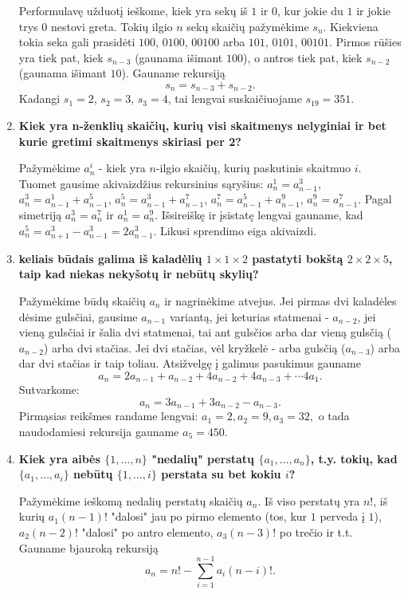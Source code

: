 \begin{enumerate}
Performulavę užduotį ieškome, kiek yra sekų iš $1$ ir $0$, kur jokie du $1$ ir jokie trys $0$ nestovi greta. Tokių ilgio $n$ sekų skaičių pažymėkime $s_n$. Kiekviena tokia seka gali prasidėti $100$, $0100$, $00100$ arba $101$, $0101$, $00101.$ Pirmos rūšies yra tiek pat, kiek $s_{n-3}$ (gaunama išimant $100$), o antros tiek pat, kiek $s_{n-2}$ (gaunama išimant $10$). Gauname rekursiją $$s_n = s_{n-3} + s_{n-2}.$$ Kadangi $s_1 = 2$, $s_2 = 3$, $s_3 = 4$, tai lengvai suskaičiuojame $s_{19} = 351.$\medskip

\item {\bf Kiek yra n-ženklių skaičių, kurių visi skaitmenys nelyginiai ir bet kurie gretimi skaitmenys skiriasi per 2?}

Pažymėkime $a_{n}^i$ - kiek yra $n$-ilgio skaičių, kurių paskutinis skaitmuo $i$. Tuomet gausime akivaizdžius rekursinius sąryšius: $a_{n}^1 = a_{n-1}^3$, $a_{n}^3 = a_{n-1}^1 + a_{n-1}^5$, $a_{n}^5 = a_{n-1}^3 + a_{n-1}^7$, $a_{n}^7 = a_{n-1}^5 + a_{n-1}^9$, $a_{n}^9 = a_{n-1}^7$. Pagal simetriją $a_{n}^3 = a_{n}^7$ ir $a_{n}^1 = a_{n}^9.$ Išsireiškę ir įsistatę lengvai gauname, kad $a_{n}^{5} = a_{n+1}^3 - a_{n-1}^3 = 2a_{n-1}^3.$ Likusi sprendimo eiga akivaizdi. \medskip


\item {\bf keliais būdais galima iš kaladėlių $1\times 1\times 2$ pastatyti bokštą $2 \times 2 \times 5$, taip kad niekas nekyšotų ir nebūtų skylių?}

Pažymėkime būdų skaičių $a_n$ ir nagrinėkime atvejus. Jei pirmas dvi kaladėles dėsime gulsčiai, gausime $a_{n-1}$ variantą, jei keturias statmenai - $a_{n-2}$, jei vieną gulsčiai ir šalia dvi statmenai, tai ant gulsčios arba dar vieną gulsčią ($a_{n-2}$) arba dvi stačias. Jei dvi stačias, vėl kryžkelė - arba gulsčią ($a_{n-3}$) arba dar dvi stačias ir taip toliau. Atsižvelgę į galimus pasukimus gauname $$a_n = 2a_{n-1} + a_{n-2} + 4a_{n-2} + 4a_{n-3} + \cdots 4a_1.$$  
Sutvarkome: $$a_n = 3a_{n-1} + 3a_{n-2} - a_{n-3}.$$
Pirmąsias reikšmes randame lengvai: $a_1 = 2, a_2=9, a_3=32,$ o tada naudodamiesi rekursija gauname $a_5 = 450.$ \medskip

\item {\bf Kiek yra aibės $\{1,\dots, n\}$ "nedalių" perstatų $\{a_1,\dots, a_n\}$, t.y. tokių, kad $\{a_1,\dots, a_i\}$ nebūtų $\{1,\dots,i\}$ perstata su bet kokiu $i$?}

Pažymėkime ieškomą nedalių perstatų skaičių $a_n.$ Iš viso perstatų yra $n!$, iš kurių $a_1(n-1)!$ "dalosi" jau po pirmo elemento (tos, kur $1$ perveda į $1$), $a_2(n-2)!$ "dalosi" po antro elemento, $a_3(n-3)!$ po trečio ir t.t. Gauname bjauroką rekursiją $$a_n = n! - \sum_{i=1}^{n-1}{a_i(n-i)!}.$$


\end{enumerate}
